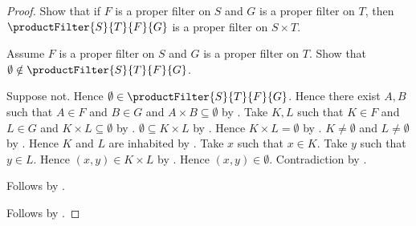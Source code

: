 \begin{proof}
    Show that if $F$ is a proper filter on $S$ and
        $G$ is a proper filter on $T$, then
        $\productFilter{S}{T}{F}{G}$ is a proper filter on $S\times T$.
    \begin{subproof}
        Assume $F$ is a proper filter on $S$ and
            $G$ is a proper filter on $T$.
        Show that $\emptyset\notin\productFilter{S}{T}{F}{G}$.
        \begin{subproof}
            Suppose not.
            Hence $\emptyset\in\productFilter{S}{T}{F}{G}$.
            Hence there exist $A,B$ such that $A\in F$ and $B\in G$ and
                $A\times B\subseteq\emptyset$ by \auto.
            Take $K,L$ such that $K\in F$ and $L\in G$ and
                $K\times L\subseteq\emptyset$ by \auto.
            $\emptyset\subseteq K\times L$ by .
            Hence $K\times L=\emptyset$ by .
            $K\neq\emptyset$ and $L\neq\emptyset$ by
                .
            Hence $K$ and $L$ are inhabited by .
            Take $x$ such that $x\in K$.
            Take $y$ such that $y\in L$.
            Hence $(x,y)\in K\times L$ by .
            Hence $(x,y)\in\emptyset$.
            Contradiction by .
        \end{subproof}
        Follows by .
    \end{subproof}
    Follows by \auto.
\end{proof}

